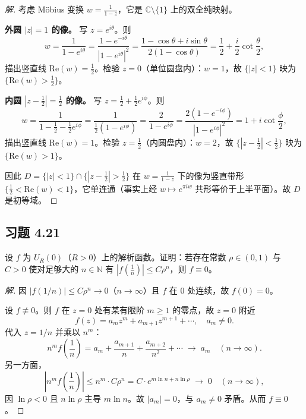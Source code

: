\documentclass[11pt,a4paper]{article}
\newcommand{\C}{\mathbb{C}}
\newcommand{\N}{\mathbb{N}}
\renewcommand{\Re}{\mathrm{Re}}
\theoremstyle{definition}
\newenvironment{solution}{\begin{proof}[解]}{\end{proof}}
\begin{document}
\begin{solution}
  考虑 M\"obius 变换 $w = \frac{1}{1-z}$，它是 $\C \setminus \{1\}$ 上的双全纯映射。

  \textbf{外圆 $|z| = 1$ 的像。}\;
  写 $z = e^{i\theta}$。则
  \[
    w = \frac{1}{1 - e^{i\theta}}
    = \frac{1 - e^{-i\theta}}{|1 - e^{i\theta}|^2}
    = \frac{1 - \cos\theta + i\sin\theta}{2(1 - \cos\theta)}
    = \frac{1}{2} + \frac{i}{2}\cot\frac{\theta}{2},
  \]
  描出竖直线 $\Re(w) = \frac{1}{2}$。检验 $z = 0$（单位圆盘内）：$w = 1$，故 $\{|z| < 1\}$ 映为 $\{\Re(w) > \frac{1}{2}\}$。

  \textbf{内圆 $|z - \tfrac{1}{2}| = \tfrac{1}{2}$ 的像。}\;
  写 $z = \frac{1}{2} + \frac{1}{2}e^{i\phi}$。则
  \[
    w = \frac{1}{1 - \frac{1}{2} - \frac{1}{2}e^{i\phi}}
    = \frac{1}{\frac{1}{2}(1 - e^{i\phi})}
    = \frac{2}{1 - e^{i\phi}}
    = \frac{2(1 - e^{-i\phi})}{|1 - e^{i\phi}|^2}
    = 1 + i\cot\frac{\phi}{2},
  \]
  描出竖直线 $\Re(w) = 1$。检验 $z = \frac{1}{2}$（内圆盘内）：$w = 2$，故 $\{|z - \frac{1}{2}| < \frac{1}{2}\}$ 映为 $\{\Re(w) > 1\}$。

  因此 $D = \{|z| < 1\} \cap \{|z - \tfrac{1}{2}| > \tfrac{1}{2}\}$ 在 $w = \frac{1}{1-z}$ 下的像为竖直带形 $\{\frac{1}{2} < \Re(w) < 1\}$，它单连通（事实上经 $w \mapsto e^{\pi i w}$ 共形等价于上半平面）。故 $D$ 是初等域。
\end{solution}

\subsection{习题 4.21}

设 $f$ 为 $U_R(0)$（$R > 0$）上的解析函数。证明：若存在常数 $\rho \in (0,1)$ 与 $C > 0$ 使对足够大的 $n \in \N$ 有 $|f(\tfrac{1}{n})| \le C\rho^n$，则 $f \equiv 0$。

\begin{solution}
  因 $|f(1/n)| \le C\rho^n \to 0$（$n \to \infty$）且 $f$ 在 $0$ 处连续，故 $f(0) = 0$。

  设 $f \not\equiv 0$。则 $f$ 在 $z = 0$ 处有某有限阶 $m \ge 1$ 的零点，故 $z = 0$ 附近
  \[
    f(z) = a_m z^m + a_{m+1} z^{m+1} + \cdots, \quad a_m \ne 0.
  \]
  代入 $z = 1/n$ 并乘以 $n^m$：
  \[
    n^m f\!\left(\frac{1}{n}\right)
    = a_m + \frac{a_{m+1}}{n} + \frac{a_{m+2}}{n^2} + \cdots
    \;\longrightarrow\; a_m \quad (n \to \infty).
  \]
  另一方面，
  \[
    \left|n^m f\!\left(\frac{1}{n}\right)\right|
    \le n^m \cdot C\rho^n
    = C \cdot e^{m\ln n + n\ln\rho}
    \;\longrightarrow\; 0 \quad (n \to \infty),
  \]
  因 $\ln\rho < 0$ 且 $n\ln\rho$ 主导 $m\ln n$。故 $|a_m| = 0$，与 $a_m \ne 0$ 矛盾。从而 $f \equiv 0$。
\end{solution}
\end{document}
